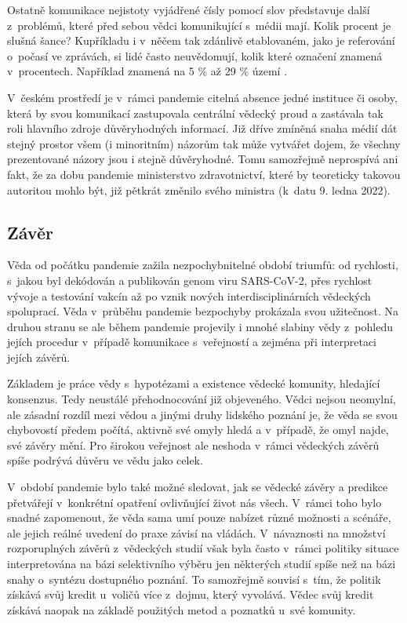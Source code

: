 Ostatně komunikace nejistoty vyjádřené čísly pomocí slov představuje další z~pro\-blé\-mů, které před sebou vědci komunikující s~médii mají. Kolik procent je slušná šance? Kupříkladu i v~něčem tak zdánlivě etablovaném, jako je referování o~počasí ve zprávách, si lidé často neuvědomují, kolik které označení znamená v~procentech. Například  znamená na 5 \% až 29 \% území \cite{Ceskyhydrometeorologickyustav}.

V~českém prostředí je v~rámci pandemie citelná absence jedné instituce či osoby, která by svou komunikací zastupovala centrální vědecký proud a zastávala tak roli hlavního zdroje důvěryhodných informací. Již dříve zmíněná snaha médií dát stejný prostor všem (i minoritním) názorům tak může vytvářet dojem, že všechny prezentované názory jsou i stejně důvěryhodné. Tomu samozřejmě neprospívá ani fakt, že za dobu pandemie ministerstvo zdravotnictví, které by teoreticky takovou autoritou mohlo být, již pětkrát změnilo svého ministra (k~datu 9. ledna 2022).

\subsection*{Závěr}

Věda od počátku pandemie zažila nezpochybnitelné období triumfů: od rychlosti, s~jakou byl dekódován a publikován genom viru SARS-CoV-2, přes rychlost vývoje a testování vakcín až po vznik nových interdisciplinárních vědeckých spoluprací. Věda v~průběhu pandemie bezpochyby prokázala svou užitečnost. Na druhou stranu se ale během pandemie projevily i mnohé slabiny vědy z~pohledu jejích procedur v~případě komunikace s~veřejností a zejména při interpretaci jejích závěrů.

Základem je práce vědy s~hypotézami a existence vědecké komunity, hledající konsenzus. Tedy neustálé přehodnocování již objeveného. Vědci nejsou neomylní, ale zásadní rozdíl mezi vědou a jinými druhy lidského poznání je, že věda se svou chybovostí předem počítá, aktivně své omyly hledá a v~případě, že omyl najde, své závěry mění. Pro širokou veřejnost ale neshoda v~rámci vědeckých závěrů spíše podrývá důvěru ve vědu jako celek.

V~období pandemie bylo také možné sledovat, jak se vědecké závěry a predikce přetvářejí v~konkrétní opatření ovlivňující život nás všech. V~rámci toho bylo snadné zapomenout, že věda sama umí pouze nabízet různé možnosti a scénáře, ale jejich reálné uvedení do praxe závisí na vládách. V~návaznosti na množství rozporuplných závěrů z~vědeckých studií však byla často v~rámci politiky situace interpretována na bázi selektivního výběru jen některých studií spíše než na bázi snahy o~syntézu dostupného poznání. To samozřejmě souvisí s~tím, že politik získává svůj kredit u~voličů více z~dojmu, který vyvolává. Vědec svůj kredit získává naopak na základě použitých metod a poznatků u~své komunity.

